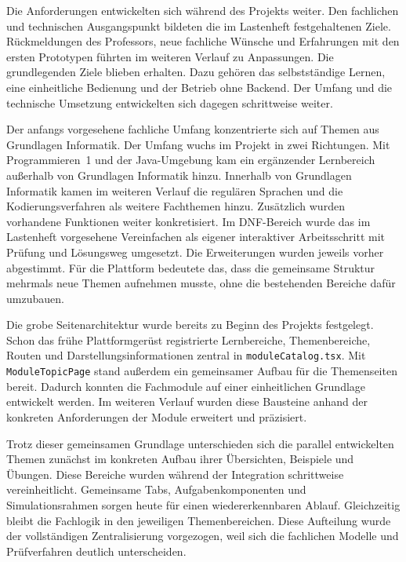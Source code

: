  \label{5_4_DI}

Die Anforderungen entwickelten sich während des Projekts weiter. Den fachlichen und
technischen Ausgangspunkt bildeten die im Lastenheft festgehaltenen Ziele. Rückmeldungen
des Professors, neue fachliche Wünsche und Erfahrungen mit den ersten Prototypen führten
im weiteren Verlauf zu Anpassungen. Die grundlegenden Ziele blieben erhalten. Dazu
gehören das selbstständige Lernen, eine einheitliche Bedienung und der Betrieb ohne
Backend. Der Umfang und die technische Umsetzung entwickelten sich dagegen schrittweise
weiter.

Der anfangs vorgesehene fachliche Umfang konzentrierte sich auf Themen aus Grundlagen
Informatik. Der Umfang wuchs im Projekt in zwei Richtungen. Mit Programmieren~1 und der
Java-Umgebung kam ein ergänzender Lernbereich außerhalb von Grundlagen Informatik hinzu.
Innerhalb von Grundlagen Informatik kamen im weiteren Verlauf die regulären Sprachen und
die Kodierungsverfahren als weitere Fachthemen hinzu. Zusätzlich wurden vorhandene
Funktionen weiter konkretisiert. Im DNF-Bereich wurde das im Lastenheft vorgesehene
Vereinfachen als eigener interaktiver Arbeitsschritt mit Prüfung und Lösungsweg umgesetzt.
Die Erweiterungen wurden jeweils vorher abgestimmt. Für die Plattform bedeutete das, dass
die gemeinsame Struktur mehrmals neue Themen aufnehmen musste, ohne die bestehenden
Bereiche dafür umzubauen.

Die grobe Seitenarchitektur wurde bereits zu Beginn des Projekts festgelegt. Schon das
frühe Plattformgerüst registrierte Lernbereiche, Themenbereiche, Routen und
Darstellungsinformationen zentral in \texttt{moduleCatalog.tsx}. Mit
\texttt{ModuleTopicPage} stand außerdem ein gemeinsamer Aufbau für die Themenseiten bereit.
Dadurch konnten die Fachmodule auf einer einheitlichen Grundlage entwickelt werden. Im
weiteren Verlauf wurden diese Bausteine anhand der konkreten Anforderungen der Module
erweitert und präzisiert.

Trotz dieser gemeinsamen Grundlage unterschieden sich die parallel entwickelten Themen
zunächst im konkreten Aufbau ihrer Übersichten, Beispiele und Übungen. Diese Bereiche
wurden während der Integration schrittweise vereinheitlicht. Gemeinsame Tabs,
Aufgabenkomponenten und Simulationsrahmen sorgen heute für einen wiedererkennbaren Ablauf.
Gleichzeitig bleibt die Fachlogik in den jeweiligen Themenbereichen. Diese Aufteilung wurde
der vollständigen Zentralisierung vorgezogen, weil sich die fachlichen Modelle und
Prüfverfahren deutlich unterscheiden.

